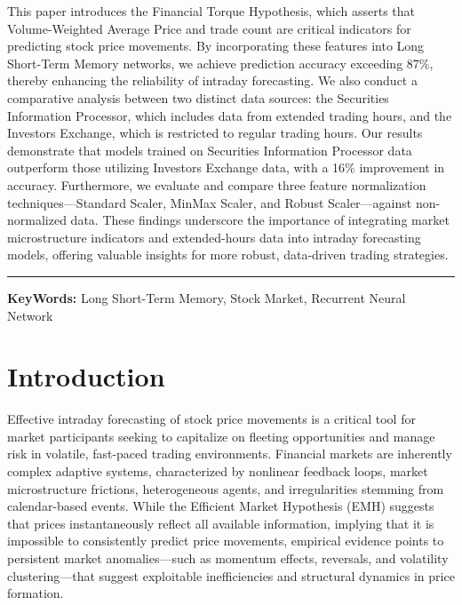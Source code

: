 \documentclass[letterpaper]{article}
\begin{document}
This paper introduces the Financial Torque Hypothesis, which asserts that Volume-Weighted Average Price and trade count are critical indicators for predicting stock price movements. By incorporating these features into Long Short-Term Memory networks, we achieve prediction accuracy exceeding 87\%, thereby enhancing the reliability of intraday forecasting. 
We also conduct a comparative analysis between two distinct data sources: the Securities Information Processor, which includes data from extended trading hours, and the Investors Exchange, which is restricted to regular trading hours. Our results demonstrate that models trained on Securities Information Processor data outperform those utilizing Investors Exchange data, with a 16\% improvement in accuracy. 
Furthermore, we evaluate and compare three feature normalization techniques—Standard Scaler, MinMax Scaler, and Robust Scaler—against non-normalized data. 
These findings underscore the importance of integrating market microstructure indicators and extended-hours data into intraday forecasting models, offering valuable insights for more robust, data-driven trading strategies.

\vspace{0.5mm}
\noindent\rule{\textwidth}{1pt}

\textbf{KeyWords:} Long Short-Term Memory, Stock Market, Recurrent Neural Network 

\newpage



\section{Introduction}

Effective intraday forecasting of stock price movements is a critical tool for market participants seeking to capitalize on fleeting opportunities and manage risk in volatile, fast-paced trading environments. Financial markets are inherently complex adaptive systems, characterized by nonlinear feedback loops, market microstructure frictions, heterogeneous agents, and irregularities stemming from calendar-based events. While the Efficient Market Hypothesis (EMH) suggests that prices instantaneously reflect all available information, implying that it is impossible to consistently predict price movements, empirical evidence points to persistent market anomalies—such as momentum effects, reversals, and volatility clustering—that suggest exploitable inefficiencies and structural dynamics in price formation.
\end{document}
